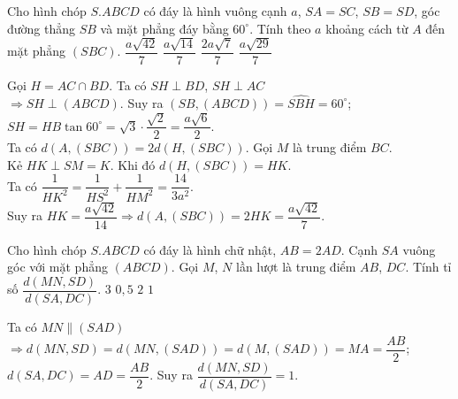 \begin{ex}%
 Cho hình chóp $S.ABCD$ có đáy là hình vuông cạnh $a$, $SA=SC$, $SB=SD$, góc đường thẳng $SB$ và mặt phẳng đáy bằng $60^\circ$. Tính theo $a$ khoảng cách từ $A$ đến mặt phẳng $(SBC)$.
\choice
{\True $\dfrac{a\sqrt{42}}{7}$}
{$\dfrac{a\sqrt{14}}{7}$}
{$\dfrac{2a\sqrt{7}}{7}$}
{$\dfrac{a\sqrt{29}}{7}$}
\loigiai
{
\immini
{Gọi $H=AC\cap BD$. Ta có $SH\perp BD$, $SH\perp AC$\\
$\Rightarrow SH\perp (ABCD)$. Suy ra $(SB, (ABCD))=\widehat{SBH}=60^\circ$;\\ 
$SH=HB\tan60^\circ=\sqrt{3}\cdot\dfrac{\sqrt{2}}{2}=\dfrac{a\sqrt{6}}{2}$.\\
Ta có $d(A, (SBC))=2d(H, (SBC))$. Gọi $M$ là trung điểm $BC$.\\ 
Kẻ $HK\perp SM=K$. Khi đó $d(H, (SBC))=HK$.\\ 
Ta có $\dfrac{1}{HK^2}=\dfrac{1}{HS^2}+\dfrac{1}{HM^2}=\dfrac{14}{3a^2}$.\\
Suy ra $HK=\dfrac{a\sqrt{42}}{14}\Rightarrow d(A, (SBC))=2HK=\dfrac{a\sqrt{42}}{7}$.
}
{
}
}
\end{ex}


\begin{ex}%
 Cho hình chóp $S.ABCD$ có đáy là hình chữ nhật, $AB=2AD$. Cạnh $SA$ vuông góc với mặt phẳng $(ABCD)$. Gọi $M$, $N$ lần lượt là trung điểm $AB$, $DC$. Tính tỉ số $\dfrac{d(MN,SD)}{d(SA,DC)}$.
\choice
{$3$	}
{$0{,}5$}
{$2$	}
{\True $1$}
\loigiai
{
\immini
{Ta có $MN\parallel (SAD)$\\$
\Rightarrow d(MN,SD)=d(MN, (SAD))=d(M, (SAD))=MA=\dfrac{AB}{2}$;\\ 
$d(SA, DC)=AD=\dfrac{AB}{2}$. Suy ra $\dfrac{d(MN,SD)}{d(SA,DC)}=1$.
}
{
}
}
\end{ex}



